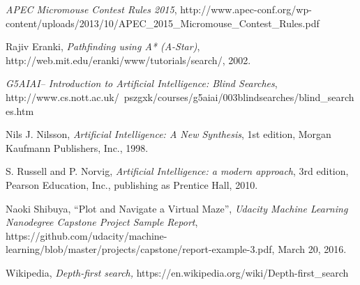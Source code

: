 \documentclass[11pt, oneside]{article}   	%
\begin{document}
\begin{thebibliography}{1}

   {\em APEC Micromouse Contest Rules 2015}, http://www.apec-conf.org/wp-content/uploads/2013/10/APEC\_2015\_Micromouse\_Contest\_Rules.pdf

   Rajiv Eranki, {\em Pathfinding using A* (A-Star)}, http://web.mit.edu/eranki/www/tutorials/search/, 2002. 

   {\em G5AIAI-- Introduction to Artificial Intelligence: Blind Searches}, http://www.cs.nott.ac.uk/~pszgxk/courses/g5aiai/003blindsearches/blind\_searches.htm

   Nils J. Nilsson, {\em Artificial Intelligence: A New Synthesis}, 1st edition, Morgan Kaufmann Publishers, Inc., 1998.

   S. Russell and P. Norvig, {\em Artificial Intelligence: a modern approach}, 3rd edition, Pearson Education, Inc., publishing as Prentice Hall, 2010.


   Naoki Shibuya, ``Plot and Navigate a Virtual Maze'', {\em Udacity Machine Learning Nanodegree Capstone Project Sample Report}, https://github.com/udacity/machine-learning/blob/master/projects/capstone/report-example-3.pdf, March 20, 2016.

   Wikipedia, {\em Depth-first search,} https://en.wikipedia.org/wiki/Depth-first\_search

  \end{thebibliography}
\end{document}
